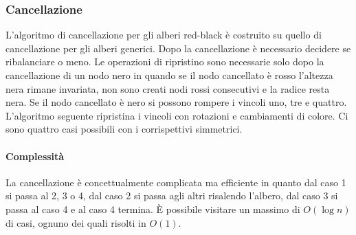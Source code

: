 \subsubsection{Cancellazione}
L'algoritmo di cancellazione per gli alberi red-black \`e costruito su quello di cancellazione per gli alberi generici. Dopo la cancellazione \`e necessario
decidere se ribalanciare o meno. Le operazioni di ripristino sono necessarie solo dopo la cancellazione di un nodo nero in quando se il nodo cancellato \`e
rosso l'altezza nera rimane invariata, non sono creati nodi rossi consecutivi e la radice resta nera. Se il nodo cancellato \`e nero si possono rompere i 
vincoli uno, tre e quattro. L'algoritmo seguente ripristina i vincoli con rotazioni e cambiamenti di colore. Ci sono quattro casi possibili con i 
corrispettivi simmetrici. 

\paragraph{Complessit\`a}
La cancellazione \`e concettualmente complicata ma efficiente in quanto dal caso 1 si passa al 2, 3 o 4, dal caso 2 si passa agli altri risalendo l'albero,
dal caso 3 si passa al caso 4 e al caso 4 termina. \`E possibile visitare un massimo di $O(\log n)$ di casi, ognuno dei quali risolti in $O(1)$.
